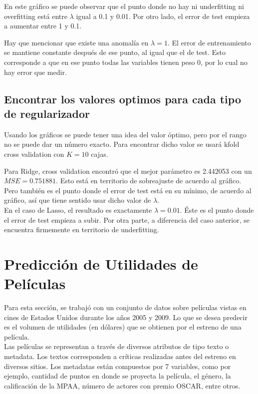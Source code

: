 \documentclass[letter, 10pt]{article}
\begin{document}
En este gráfico se puede observar que el punto donde no hay ni underfitting ni
overfitting está entre $\lambda$ igual a 0.1 y 0.01. Por otro lado, el error de
test empieza a aumentar entre 1 y 0.1.

Hay que mencionar que existe una anomalía en $\lambda = 1$. El error de
entrenamiento se mantiene constante después de ese punto, al igual que el de
test. Esto corresponde a que en ese punto todas las variables tienen peso 0, por
lo cual no hay error que medir.
\subsection{Encontrar los valores optimos para cada tipo de regularizador}
Usando los gráficos se puede tener una idea del valor óptimo, pero por el rango
no se puede dar un número exacto. Para encontrar dicho valor se usará kfold
cross validation con $K = 10$ cajas.

Para Ridge, cross validation encontró que el mejor parámetro es 2.442053 con un
$MSE = 0.751881$. Esto está en territorio de sobreajuste de acuerdo al gráfico.
Pero también es el punto donde el error de test está en su mínimo, de acuerdo al
gráfico, así que tiene sentido usar dicho valor de $\lambda$.\\

En el caso de Lasso, el resultado es exactamente $\lambda = 0.01$. Éste es el punto donde el
error de test empieza a subir. Por otra parte, a diferencia del caso anterior,
se encuentra firmemente en territorio de underfitting.
\section{Predicción de Utilidades de Películas}

Para esta sección, se trabajó con un conjunto de datos sobre películas vistas en cines de Estados Unidos durante los años 2005 y 2009. Lo que se desea predecir es el volumen de utilidades (en dólares) que se obtienen por el estreno de una película.\\

Las películas se representan a través de diversos atributos de tipo texto o metadata. Los textos corresponden a críticas realizadas antes del estreno en diversos sitios. Los metadatas están compuestos por 7 variables, como por ejemplo, cantidad de puntos en donde se proyecta la película, el género, la calificación de la MPAA, número de actores con premio OSCAR, entre otros.\\
\end{document}
